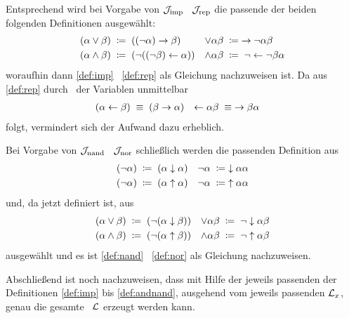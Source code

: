 Entsprechend wird bei Vorgabe von $\mathcal{J}_{\mathrm{imp}}$ \textbzgl\ $\mathcal{J}_{\mathrm{rep}}$ die passende der beiden folgenden Definitionen ausgewählt:
\begin{align}
	(\alpha \lor  \beta) & \;\coloneqq\; ((\lnot \alpha) \rightarrow \beta)         &
	\lor \alpha   \beta  & \;\coloneqq\;   \rightarrow \lnot \alpha \beta
	\label{def:orrep}
	\\
	(\alpha \land \beta) & \;\coloneqq\; (\lnot ((\lnot \beta) \leftarrow \alpha)) &
	\land \alpha  \beta  & \;\coloneqq\;  \lnot \leftarrow \lnot \beta \alpha
	\label{def:andrep}
\end{align}
woraufhin dann \eqref{def:imp} \textbzgl\ \eqref{def:rep} als Gleichung nachzuweisen ist.
Da aus \eqref{def:rep} durch \Vertauschung\ der Variablen unmittelbar
\begin{align}
	(\alpha \leftarrow \beta) & \;\equiv\; (\beta \rightarrow \alpha) &
	\leftarrow \alpha  \beta  & \;\equiv\;  \rightarrow \beta \alpha  \label{eq:repimp}
\end{align}
folgt, vermindert sich der Aufwand dazu erheblich.

Bei Vorgabe von $\mathcal{J}_{\mathrm{nand}}$ \textbzgl\ $\mathcal{J}_{\mathrm{nor}}$ schließlich werden die passenden Definition aus
\begin{align}
	(\lnot \alpha) & \;\coloneqq\; (\alpha \downarrow \alpha)  &
	\lnot  \alpha  & \;\coloneqq\;  \downarrow \alpha \alpha   \label{def:notnor} \\
	(\lnot \alpha) & \;\coloneqq\; (\alpha \uparrow \alpha) &
	\lnot  \alpha  & \;\coloneqq\;  \uparrow \alpha \alpha  \label{def:notnand}
\end{align}
und, da \chrqt{$\lnot$} jetzt definiert ist, aus
\begin{align}
	(\alpha \lor \beta)  & \;\coloneqq\; (\lnot(\alpha \downarrow \beta))  &
	\lor \alpha  \beta   & \;\coloneqq\;  \lnot \downarrow \alpha \beta
	\label{def:ornor} \\
	(\alpha \land \beta) & \;\coloneqq\; (\lnot(\alpha \uparrow \beta)) &
	\land \alpha  \beta  & \;\coloneqq\;  \lnot \uparrow \alpha \beta
	\label{def:andnand}
\end{align}
ausgewählt und es ist \eqref{def:nand} \textbzgl\ \eqref{def:nor} als Gleichung nachzuweisen.

Abschließend ist noch nachzuweisen, dass mit Hilfe der jeweils passenden der Definitionen \eqref{def:imp} bis \eqref{def:andnand}, ausgehend vom jeweils passenden $\mathcal{L}_x$, genau die gesamte \Formelmenge\ $\mathcal{L}$ erzeugt werden kann.

